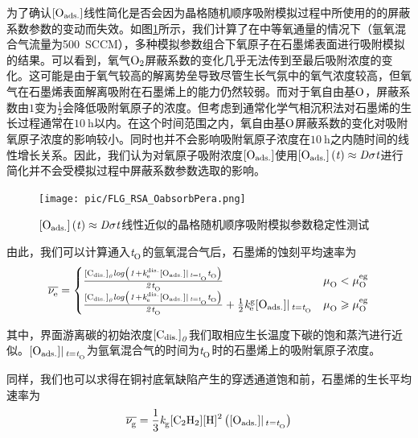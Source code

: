为了确认$\rm{\left[O_{ads.}\right]} \it$线性简化是否会因为晶格随机顺序吸附模拟过程中所使用的的屏蔽系数参数的变动而失效。如图\ref{fig:FLG_RSA_OabsorbPera}所示，我们计算了在中等氧通量的情况下（氩氧混合气流量为\SI{500}{SCCM}），多种模拟参数组合下氧原子在石墨烯表面进行吸附模拟的结果。可以看到，氧气$\cemb{O2}$屏蔽系数的变化几乎无法传到至最后吸附浓度的变化。这可能是由于氧气较高的解离势垒导致尽管生长气氛中的氧气浓度较高，但氧气在石墨烯表面解离吸附在石墨烯上的能力仍然较弱。而对于氧自由基$\cemb{O}$，屏蔽系数由$1$变为$\frac{1}{2}$会降低吸附氧原子的浓度。但考虑到通常化学气相沉积法对石墨烯的生长过程通常在$\SI{10}{\hour}$以内。在这个时间范围之内，氧自由基$\cemb{O}$屏蔽系数的变化对吸附氧原子浓度的影响较小。同时也并不会影响吸附氧原子浓度在$\SI{10}{\hour}$之内随时间的线性增长关系。因此，我们认为对氧原子吸附浓度$\rm{\left[O_{ads.}\right]} \it$使用$\rm{\left[O_{ads.}\right]} \it\left(\it t\right)\approx \it D \sigma t$进行简化并不会受模拟过程中屏蔽系数参数选取的影响。

\begin{figure}[htb]
    \texttt{[image: pic/FLG\_RSA\_OabsorbPera.png]}
    \caption{$\rm{\left[O_{ads.}\right]} \it\left(\it t\right)\approx \it D \sigma t$线性近似的晶格随机顺序吸附模拟参数稳定性测试}
    \label{fig:FLG_RSA_OabsorbPera}
\end{figure}

由此，我们可以计算通入$\it{t_{\rm O}^{\rm }} \it$的氩氧混合气后，石墨烯的蚀刻平均速率为\chinesecolon
\begin{equation}
    \label{eq:FLG_avgVe}
    \overline{\nu_{\rm e}^{\rm } \it}=
    \begin{cases}
        \frac{\rm{\left[C_{dis.}\right]} \it_0 log\left( 1+\it{k_{\rm e}^{\rm dis.}} \it\rm{\left[O_{ads.}\right]} \it | \,_{t=\it{t_{\rm O}^{\rm }} \it} \it{t_{\rm O}^{\rm }} \it \right) }{\it 2 \it{t_{\rm O}^{\rm }} \it}                                                        & \mu_{\rm O}^{\rm } \it < \mu_{\rm O}^{\rm eg} \it         \\
        \frac{\rm{\left[C_{dis.}\right]} \it_0 log\left( 1+\it{k_{\rm e}^{\rm dis.}} \it\rm{\left[O_{ads.}\right]} \it | \,_{t=\it{t_{\rm O}^{\rm }} \it} \it{t_{\rm O}^{\rm }} \it \right) }{\it 2 \it{t_{\rm O}^{\rm }} \it} + \frac{1}{2}\it{k_{\rm e}^{\rm g}} \it\rm{\left[O_{ads.}\right]} \it| \,_{t=\it{t_{\rm O}^{\rm }} \it} & \mu_{\rm O}^{\rm } \it \geqslant \mu_{\rm O}^{\rm eg} \it
    \end{cases}
\end{equation}

其中，界面游离碳的初始浓度$\rm{\left[C_{dis.}\right]} \it_0$我们取相应生长温度下碳的饱和蒸汽进行近似。$\rm{\left[O_{ads.}\right]} \it| \,_{t=\it{t_{\rm O}^{\rm }} \it}$为氩氧混合气的时间为$\it{t_{\rm O}^{\rm }} \it$时的石墨烯上的吸附氧原子浓度。

同样，我们也可以求得在铜衬底氧缺陷产生的穿透通道饱和前，石墨烯的生长平均速率为\chinesecolon
\begin{equation}
    \label{eq:FLG_avgVg}
    \overline{\RateV{g}{}} =\frac{1}{3}\RateK{g}{}\cemb{[C2H2]}\cemb{[H]^2}\left(\Oads |_{\,\ReactTime{}{}=\ReactTime{O}{}} \right)
\end{equation}

